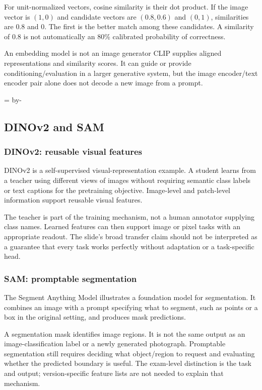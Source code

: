 \documentclass[11pt]{article}
\newcommand{\newsubsection}[1]{\par\begingroup\skip0=\pagegoal\advance\skip0 by-\pagetotal\ifdim\skip0<12\baselineskip\newpage\fi\endgroup\subsection{#1}}
\begin{document}
For unit-normalized vectors, cosine similarity is their dot product. If the image vector is $(1,0)$ and candidate vectors are $(0.8,0.6)$ and $(0,1)$, similarities are $0.8$ and 0. The first is the better match among these candidates. A similarity of 0.8 is not automatically an 80\% calibrated probability of correctness.

\begin{careful}{An embedding model is not an image generator}
CLIP supplies aligned representations and similarity scores. It can guide or provide conditioning/evaluation in a larger generative system, but the image encoder/text encoder pair alone does not decode a new image from a prompt.
\end{careful}

\newsubsection{DINOv2 and SAM}
\subsubsection{DINOv2: reusable visual features}
DINOv2 is a self-supervised visual-representation example. A student learns from a teacher using different views of images without requiring semantic class labels or text captions for the pretraining objective. Image-level and patch-level information support reusable visual features.

The teacher is part of the training mechanism, not a human annotator supplying class names. Learned features can then support image or pixel tasks with an appropriate readout. The slide's broad transfer claim should not be interpreted as a guarantee that every task works perfectly without adaptation or a task-specific head.

\subsubsection{SAM: promptable segmentation}
The Segment Anything Model illustrates a foundation model for segmentation. It combines an image with a prompt specifying what to segment, such as points or a box in the original setting, and produces mask predictions.

A segmentation mask identifies image regions. It is not the same output as an image-classification label or a newly generated photograph. Promptable segmentation still requires deciding what object/region to request and evaluating whether the predicted boundary is useful. The exam-level distinction is the task and output; version-specific feature lists are not needed to explain that mechanism.
\end{document}
